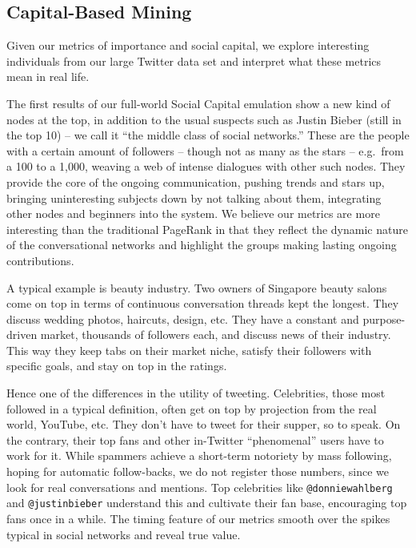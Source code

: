\documentclass[10pt,oneside]{memoir}
\begin{document}
\pagebreak \subsection{Capital-Based Mining}
\label{capital-basedmining}

Given our metrics of importance and social capital, we explore interesting individuals from our large Twitter data set and interpret what these metrics mean in real life. 


The first results of our full-world Social Capital emulation show a new kind of nodes at the top, in addition to the usual suspects such as Justin Bieber (still in the top 10) -- we call it ``the middle class of social networks.'' These are the people with a certain amount of followers -- though not as many as the stars -- e.g.\ from a 100 to a 1,000, weaving a web of intense dialogues with other such nodes. They provide the core of the ongoing communication, pushing trends and stars up, bringing uninteresting subjects down by not talking about them, integrating other nodes and beginners into the system. We believe our metrics are more interesting than the traditional PageRank in that they reflect the dynamic nature of the conversational networks and highlight the groups making lasting ongoing contributions.


A typical example is beauty industry. Two owners of Singapore beauty salons come on top in terms of continuous conversation threads kept the longest. They discuss wedding photos, haircuts, design, etc. They have a constant and purpose-driven market, thousands of followers each, and discuss news of their industry. This way they keep tabs on their market niche, satisfy their followers with specific goals, and stay on top in the ratings.


Hence one of the differences in the utility of tweeting. Celebrities, those most followed in a typical definition, often get on top by projection from the real world, YouTube, etc. They don't have to tweet for their supper, so to speak. On the contrary, their top fans and other in-Twitter ``phenomenal'' users have to work for it. While spammers achieve a short-term notoriety by mass following, hoping for automatic follow-backs, we do not register those numbers, since we look for real conversations and mentions. Top celebrities like \texttt{@donniewahlberg} and \texttt{@justinbieber} understand this and cultivate their fan base, encouraging top fans once in a while. The timing feature of our metrics smooth over the spikes typical in social networks and reveal true value.
\end{document}
